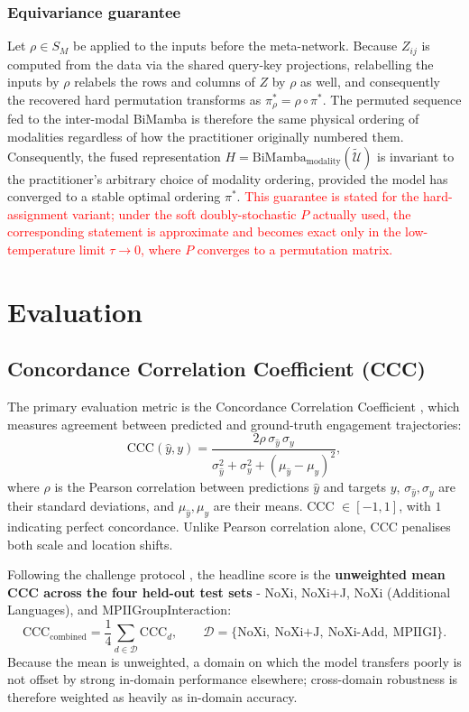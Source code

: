 \documentclass[11pt,a4paper]{article}
\begin{document}
	\subsubsection*{Equivariance guarantee}
	Let $\rho \in S_M$ be applied to the inputs before the meta-network. Because $Z_{ij}$ is computed from the data via the shared query-key projections, relabelling the inputs by $\rho$ relabels the rows and columns of $Z$ by $\rho$ as well, and consequently the recovered hard permutation transforms as $\pi^*_\rho = \rho \circ \pi^*$. The permuted sequence fed to the inter-modal BiMamba is therefore the same physical ordering of modalities regardless of how the practitioner originally numbered them. Consequently, the fused representation $H = \text{BiMamba}_{\text{modality}}(\tilde{\mathcal{U}})$ is invariant to the practitioner's arbitrary choice of modality ordering, provided the model has converged to a stable optimal ordering $\pi^*$. \textcolor{red}{This guarantee is stated for the hard-assignment variant; under the soft doubly-stochastic $P$ actually used, the corresponding statement is approximate and becomes exact only in the low-temperature limit $\tau \to 0$, where $P$ converges to a permutation matrix.}
	
	\section{Evaluation}

	\subsection{Concordance Correlation Coefficient (CCC)}
	The primary evaluation metric is the Concordance Correlation Coefficient \cite{lin1989ccc}, which measures agreement between predicted and ground-truth engagement trajectories:
	$$
	\text{CCC}(\hat{y}, y) = \frac{2\rho\,\sigma_{\hat{y}}\,\sigma_y}{\sigma_{\hat{y}}^2 + \sigma_y^2 + (\mu_{\hat{y}} - \mu_y)^2},
	$$
	where $\rho$ is the Pearson correlation between predictions $\hat{y}$ and targets $y$, $\sigma_{\hat{y}}, \sigma_y$ are their standard deviations, and $\mu_{\hat{y}}, \mu_y$ are their means. CCC $\in [-1, 1]$, with $1$ indicating perfect concordance. Unlike Pearson correlation alone, CCC penalises both scale and location shifts.

	Following the challenge protocol \cite{withanage25}, the headline score is the \textbf{unweighted mean CCC across the four held-out test sets} - NoXi, NoXi+J, NoXi (Additional Languages), and MPIIGroupInteraction:
	$$
	\text{CCC}_{\text{combined}} = \frac{1}{4}\sum_{d \in \mathcal{D}} \text{CCC}_d, \qquad \mathcal{D} = \{\text{NoXi},\ \text{NoXi+J},\ \text{NoXi-Add},\ \text{MPIIGI}\}.
	$$
	Because the mean is unweighted, a domain on which the model transfers poorly is not offset by strong in-domain performance elsewhere; cross-domain robustness is therefore weighted as heavily as in-domain accuracy.
\end{document}
